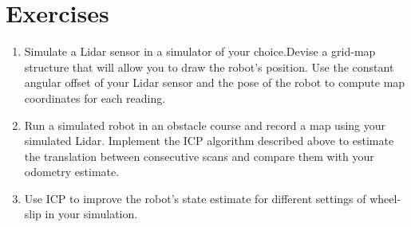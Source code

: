 \section*{Exercises}
\begin{enumerate}
\item Simulate a Lidar sensor in a simulator of your choice.Devise a grid-map structure that will allow you to draw the robot's position. Use the constant angular offset of your Lidar sensor and the pose of the robot to compute map coordinates for each reading.
\item Run a simulated robot in an obstacle course and record a map using your simulated Lidar. Implement the ICP algorithm described above to estimate the translation between consecutive scans and compare them with your odometry estimate. 
\item Use ICP to improve the robot's state estimate for different settings of wheel-slip in your simulation.  
\end{enumerate}


%
%
%


